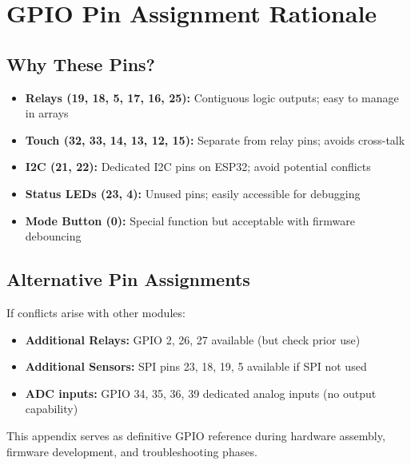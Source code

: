 \section{GPIO Pin Assignment Rationale}

\subsection{Why These Pins?}

\begin{itemize}
    \item \textbf{Relays (19, 18, 5, 17, 16, 25):} Contiguous logic outputs; easy to manage in arrays
    \item \textbf{Touch (32, 33, 14, 13, 12, 15):} Separate from relay pins; avoids cross-talk
    \item \textbf{I2C (21, 22):} Dedicated I2C pins on ESP32; avoid potential conflicts
    \item \textbf{Status LEDs (23, 4):} Unused pins; easily accessible for debugging
    \item \textbf{Mode Button (0):} Special function but acceptable with firmware debouncing
\end{itemize}

\subsection{Alternative Pin Assignments}

If conflicts arise with other modules:

\begin{itemize}
    \item \textbf{Additional Relays:} GPIO 2, 26, 27 available (but check prior use)
    \item \textbf{Additional Sensors:} SPI pins 23, 18, 19, 5 available if SPI not used
    \item \textbf{ADC inputs:} GPIO 34, 35, 36, 39 dedicated analog inputs (no output capability)
\end{itemize}

This appendix serves as definitive GPIO reference during hardware assembly, firmware development, and troubleshooting phases.
